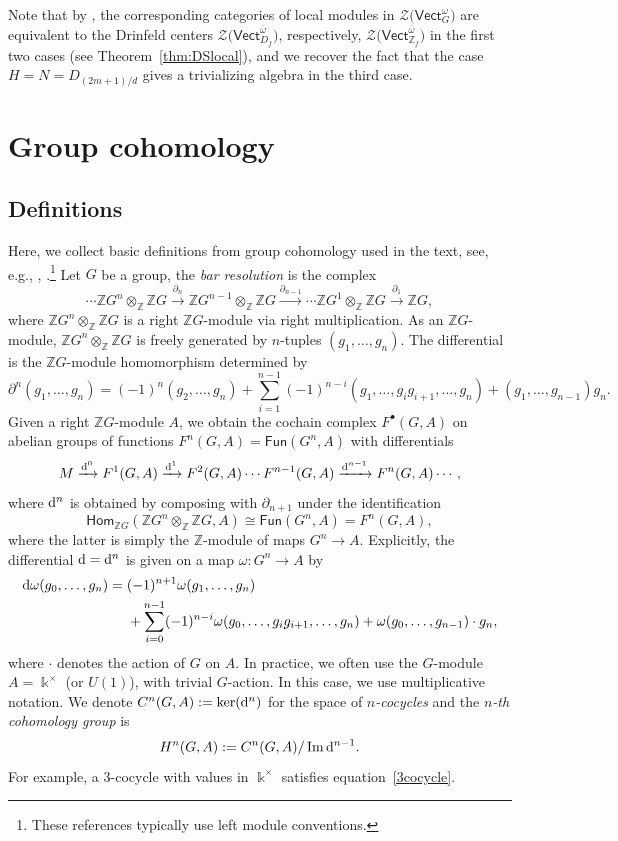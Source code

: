 \documentclass[10pt,a4paper]{amsart}
\numberwithin{equation}{section}
\newcommand{\ov}[1]{\overline{#1}}
\newcommand{\deri}{{\rm d}}
\newcommand{\Hom}{\mathsf{Hom}}
\newcommand{\Img}{\operatorname{Im}}
\newcommand{\Fun}{\mathsf{Fun}}
\newcommand{\Vect}{\mathsf{Vect}}
\newcommand{\mZ}{\mathbb{Z}}
\newcommand{\cZ}{\mathcal{Z}}
\begin{document}
 Note that by \cite{Sch}, the corresponding categories of local modules in $\cZ\big(\Vect_G^\omega\big)$ are equivalent to the Drinfeld centers $\cZ\big(\Vect_{D_f}^{\ov{\omega}}\big)$, respectively, $\cZ\big(\Vect_{\mZ_f}^{\ov{\omega}}\big)$ in the first two cases (see Theorem~\ref{thm:DSlocal}), and we recover the fact that the case $H=N=D_{(2m+1)/d}$ gives a trivializing algebra in the third case.

\appendix
\section{Group cohomology}\label{appendix}

\subsection{Definitions}%

Here, we collect basic definitions from group cohomology used in the text, see, e.g., \cite[Section~3.4]{Ben}, \cite[Chapter~III]{Bro}.\footnote{These references typically use left module conventions.} Let $G$ be a group, the \emph{bar resolution} is the complex
\[\cdots \mZ G^n \otimes_{\mZ} \mZ G\xrightarrow{\partial_n} \mZ G^{n-1}\otimes_{\mZ}\mZ G \xrightarrow{\partial_{n-1}} \cdots \mZ G^1\otimes_{\mZ}\mZ G \xrightarrow{\partial_1}\mZ G,\]
where $ \mZ G^n\otimes_{\mZ} \mZ G$ is a right $\mZ G$-module via right multiplication. As an $\mZ G$-module, $\mZ G^n\otimes_{\mZ} \mZ G $ is freely generated by $n$-tuples $(g_1,\dots, g_n)$. The differential is the $\mZ G$-module homomorphism determined by
\[\partial^n(g_1,\dots, g_n)=(-1)^n(g_2,\dots, g_n)+ \sum_{i=1}^{n-1}(-1)^{n-i} (g_1,\dots, g_ig_{i+1},\dots, g_n)+ (g_1, \dots, g_{n-1})g_n.\]
Given a right $\mZ G$-module $A$, we obtain the cochain complex $F^\bullet(G,A)$ on abelian groups of functions $F^n(G,A)=\Fun(G^n,A)$ with differentials
\[ M \xrightarrow{\deri^0} F^1( G,A) \xrightarrow{\deri^1} F^2(G,A) \cdots F^{n-1}(G,A)\xrightarrow{\deri^{n-1}}
F^n(G,A)\cdots, \]
where $\deri^n$ is obtained by composing with $\partial_{n+1}$ under the identification \[\Hom_{\mZ G}(\mZ G^n\otimes_{\mZ} \mZ G,A)\cong \Fun(G^n,A)=F^n(G,A),\]
where the latter is simply the $\mZ$-module of maps $G^n\to A$. Explicitly, the differential $\deri=\deri^n$ is given on a map $\omega\colon G^n\to A$ by
\begin{equation*}%
 \begin{split}\deri \omega(g_0,\dots, g_{n})={}& (-1)^{n+1}\omega(g_1,\dots, g_{n})\\
 &{}+\sum_{i=0}^{n-1}(-1)^{n-i}\omega(g_0,\dots, g_ig_{i+1}, \dots, g_{n})+ \omega(g_0,\dots, g_{n-1})\cdot g_{n},
 \end{split}
\end{equation*}
where $\cdot$ denotes the action of $G$ on $A$. In practice, we often use the $G$-module $A=\Bbbk^\times$ (or $U(1)$), with trivial $G$-action. In this case, we use multiplicative notation.
We denote $C^n(G,A):=\ker(\deri^n)$ for the space of \emph{$n$-cocycles} and the \emph{$n$-th cohomology group} is
\[H^n(G,A):=C^n(G,A)/\Img \deri^{n-1}.\]
For example, a $3$-cocycle with values in $\Bbbk^\times$ satisfies equation~\eqref{3cocycle}.
\end{document}
